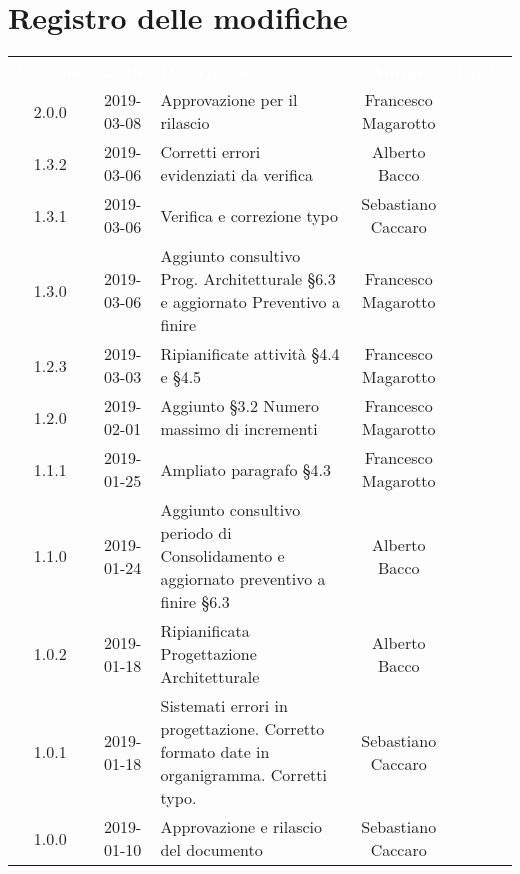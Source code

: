 \section*{Registro delle modifiche}
{
	\renewcommand{\arraystretch}{1.5}
	\centering
	\begin{longtable}{ c c  C{4cm}  c  c }
		
		\textcolor{white}{\textbf{Versione}} & \textcolor{white}{\textbf{Data}} & \textcolor{white}{\textbf{Descrizione}} & \textcolor{white}{\textbf{Autore}} & \textcolor{white}{\textbf{Ruolo}}\\
		2.0.0 & 2019-03-08 & Approvazione per il rilascio & Francesco Magarotto & \Res{}\\
		
		1.3.2 & 2019-03-06 & Corretti errori evidenziati da verifica & Alberto Bacco & \reda{}\\
		
		1.3.1 & 2019-03-06 & Verifica e correzione typo & Sebastiano Caccaro & \ver{}\\

		1.3.0 & 2019-03-06 & Aggiunto consultivo Prog. Architetturale §6.3 e aggiornato Preventivo a finire & Francesco Magarotto & \reda{}\\

		1.2.3 & 2019-03-03 & Ripianificate attività §4.4 e §4.5 & Francesco Magarotto & \reda{}\\

		1.2.0 & 2019-02-01 & Aggiunto §3.2 Numero massimo di incrementi & Francesco Magarotto & \reda{}\\

		1.1.1 & 2019-01-25 & Ampliato paragrafo §4.3 & Francesco Magarotto & \reda{}\\

		1.1.0 & 2019-01-24 & Aggiunto consultivo periodo di Consolidamento  e aggiornato preventivo a finire §6.3 & Alberto Bacco & \reda{}\\

		1.0.2 & 2019-01-18 & Ripianificata Progettazione Architetturale & Alberto Bacco & \Res{} \\

		1.0.1 & 2019-01-18 & Sistemati errori in progettazione. Corretto formato date in organigramma. Corretti typo. & Sebastiano Caccaro & \reda{}\\

		1.0.0 & 2019-01-10 & Approvazione e rilascio del documento & Sebastiano Caccaro & \Res{}\\


\end{longtable}}
